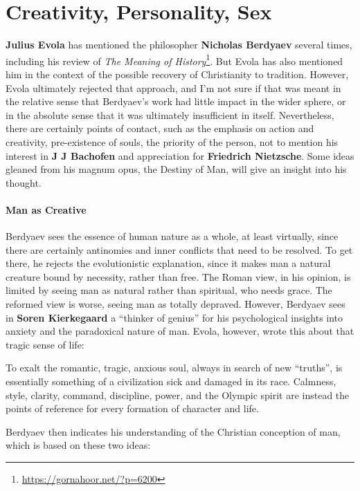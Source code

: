\section{Creativity, Personality, Sex}

\textbf{Julius Evola} has mentioned the philosopher \textbf{Nicholas Berdyaev} several times, including his review of \textit{The Meaning of History}\footnote{\url{https://gornahoor.net/?p=6200}}. But Evola has also mentioned him in the context of the possible recovery of Christianity to tradition. However, Evola ultimately rejected that approach, and I'm not sure if that was meant in the relative sense that Berdyaev's work had little impact in the wider sphere, or in the absolute sense that it was ultimately insufficient in itself. Nevertheless, there are certainly points of contact, such as the emphasis on action and creativity, pre-existence of souls, the priority of the person, not to mention his interest in \textbf{J J Bachofen} and appreciation for \textbf{Friedrich Nietzsche}. Some ideas gleaned from his magnum opus, the Destiny of Man, will give an insight into his thought.

\paragraph{Man as Creative}


Berdyaev sees the essence of human nature as a whole, at least virtually, since there are certainly antinomies and inner conflicts that need to be resolved. To get there, he rejects the evolutionistic explanation, since it makes man a natural creature bound by necessity, rather than free. The Roman view, in his opinion, is limited by seeing man as natural rather than spiritual, who needs grace. The reformed view is worse, seeing man as totally depraved. However, Berdyaev sees in \textbf{Soren Kierkegaard} a ``thinker of genius'' for his psychological insights into anxiety and the paradoxical nature of man. Evola, however, wrote this about that tragic sense of life:

\begin{quotex}
To exalt the romantic, tragic, anxious soul, always in search of new ``truths'', is essentially something of a civilization sick and damaged in its race. Calmness, style, clarity, command, discipline, power, and the Olympic spirit are instead the points of reference for every formation of character and life.
\end{quotex}


Berdyaev then indicates his understanding of the Christian conception of man, which is based on these two ideas:

